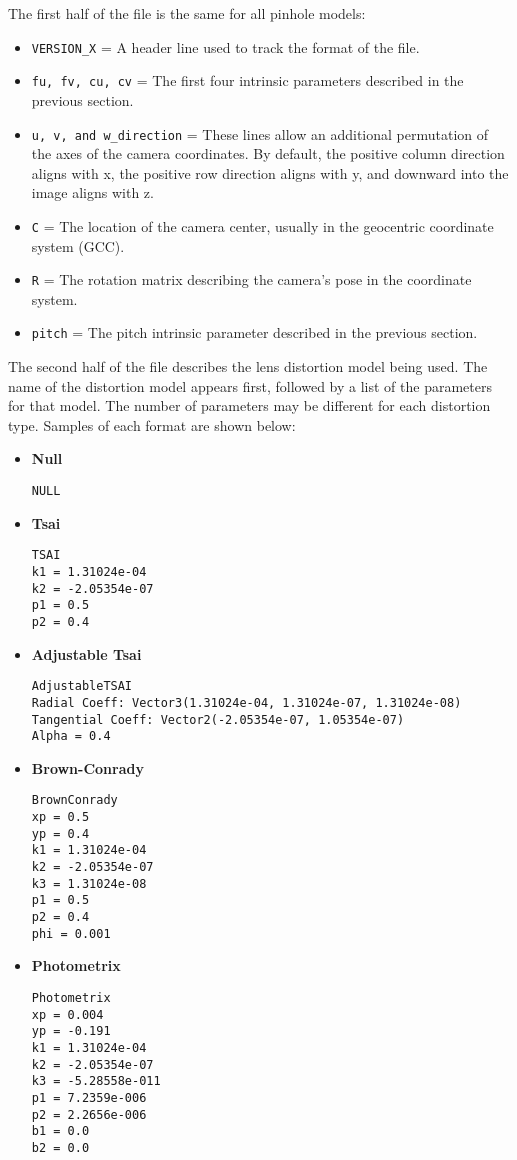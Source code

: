 The first half of the file is the same for all pinhole models:

\begin{itemize}{}
\item  \texttt{VERSION\_X} = A header line used to track the format of the file.
\item  \texttt{fu, fv, cu, cv} = The first four intrinsic parameters described in the previous section.
\item  \texttt{u, v, and w\_direction} = These lines allow an additional permutation of the 
axes of the camera coordinates.  By default, the positive column direction aligns with x, the
positive row direction aligns with y, and downward into the image aligns with z.
\item  \texttt{C} = The location of the camera center, usually in the geocentric coordinate system (GCC).
\item  \texttt{R} = The rotation matrix describing the camera's pose in the coordinate system.
\item  \texttt{pitch} = The pitch intrinsic parameter described in the previous section.
\end{itemize}

The second half of the file describes the lens distortion model being used.  The name of the
distortion model appears first, followed by a list of the parameters for that model.  The number
of parameters may be different for each distortion type.  Samples of each format are shown below:

\begin{itemize}{}
\item  \textbf{Null}
\begin{verbatim}
NULL
\end{verbatim}

\item  \textbf{Tsai}
\begin{verbatim}
TSAI
k1 = 1.31024e-04
k2 = -2.05354e-07
p1 = 0.5
p2 = 0.4
\end{verbatim}

\item  \textbf{Adjustable Tsai}
\begin{verbatim}
AdjustableTSAI
Radial Coeff: Vector3(1.31024e-04, 1.31024e-07, 1.31024e-08)
Tangential Coeff: Vector2(-2.05354e-07, 1.05354e-07)
Alpha = 0.4
\end{verbatim}

\item  \textbf{Brown-Conrady}
\begin{verbatim}
BrownConrady
xp = 0.5
yp = 0.4
k1 = 1.31024e-04
k2 = -2.05354e-07
k3 = 1.31024e-08
p1 = 0.5
p2 = 0.4
phi = 0.001
\end{verbatim}

\item  \textbf{Photometrix}
\begin{verbatim}
Photometrix
xp = 0.004
yp = -0.191
k1 = 1.31024e-04
k2 = -2.05354e-07
k3 = -5.28558e-011
p1 = 7.2359e-006
p2 = 2.2656e-006
b1 = 0.0
b2 = 0.0
\end{verbatim}

\end{itemize}{}

